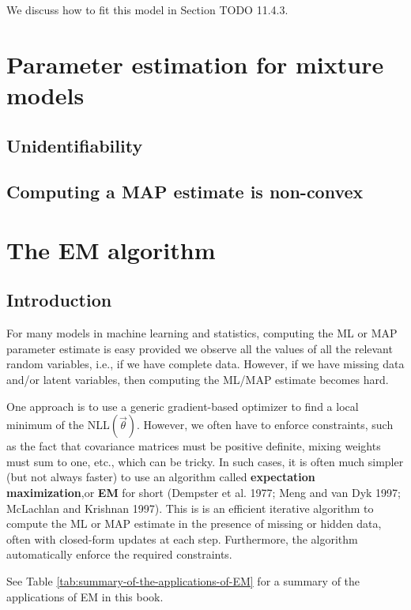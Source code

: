 We discuss how to fit this model in Section TODO 11.4.3.


\section{Parameter estimation for mixture models}


\subsection{Unidentifiability}


\subsection{Computing a MAP estimate is non-convex}


\section{The EM algorithm}


\subsection{Introduction}
For many models in machine learning and statistics, computing the ML or MAP parameter estimate is easy provided we observe all the values of all the relevant random variables, i.e., if we have complete data. However, if we have missing data and/or latent variables, then computing the ML/MAP estimate becomes hard.

One approach is to use a generic gradient-based optimizer to find a local minimum of the NLL$(\vec{\theta})$. However, we often have to enforce constraints, such as the fact that covariance matrices must be positive definite, mixing weights must sum to one, etc., which can be tricky. In such cases, it is often much simpler (but not always faster) to use an algorithm called \textbf{expectation maximization},or \textbf{EM} for short (Dempster et al. 1977; Meng and van Dyk 1997; McLachlan and Krishnan 1997). This is is an efficient iterative algorithm to compute the ML or MAP estimate in the presence of missing or hidden data, often with closed-form updates at each step. Furthermore, the algorithm automatically enforce the required constraints.

See Table \ref{tab:summary-of-the-applications-of-EM} for a summary of the applications of EM in this book.

